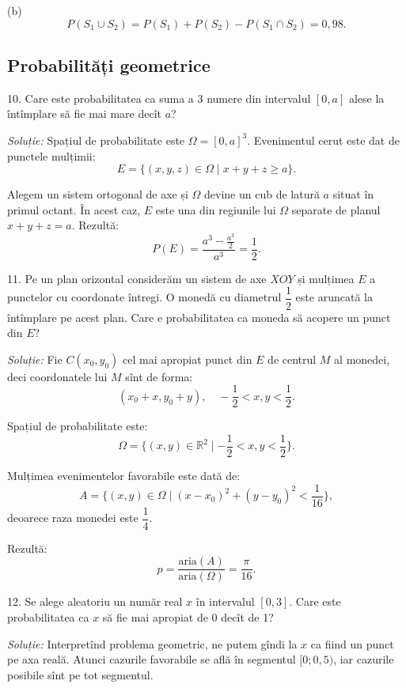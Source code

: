 \documentclass[12pt,a4paper]{article}
\newcommand\RR{\mathbb{R}}
\theoremstyle{dotless}
\theoremstyle{dotlessdr}
\begin{document}
(b) \[
  P(S_1 \cup S_2) = P(S_1) + P(S_2) - P(S_1 \cap S_2) = 0,98.
\]



\subsection*{Probabilități geometrice}

10. Care este probabilitatea ca suma a 3 numere din intervalul $ [0, a] $ alese la
întîmplare să fie mai mare decît $ a $?

\emph{Soluție:} Spațiul de probabilitate este $ \Omega = [0, a]^3 $. Evenimentul
cerut este dat de punctele mulțimii:
\[
  E = \{ (x, y, z) \in \Omega \mid x + y + z \geq a \}.
\]

Alegem un sistem ortogonal de axe și $ \Omega $ devine un cub de latură $ a $
situat în primul octant. În acest caz, $ E $ este una din regiunile lui $ \Omega $
separate de planul $ x + y + z = a $. Rezultă:
\[
  P(E) = \frac{a^3 - \frac{a^3}{2}}{a^3} = \frac{1}{2}.
\]

\vspace{1cm}

11. Pe un plan orizontal considerăm un sistem de axe $ XOY $ și mulțimea $ E $
a punctelor cu coordonate întregi. O monedă cu diametrul $ \dfrac{1}{2} $ este
aruncată la întîmplare pe acest plan. Care e probabilitatea ca moneda să
acopere un punct din $ E $?

\emph{Soluție:} Fie $ C(x_0, y_0) $ cel mai apropiat punct din $ E $ de centrul
$ M $ al monedei, deci coordonatele lui $ M $ sînt de forma:
\[
  (x_0 + x, y_0 + y), \quad -\frac{1}{2} < x,y < \frac{1}{2}.
\]

Spațiul de probabilitate este:
\[
  \Omega = \Big\{(x, y) \in \RR^2 \mid -\frac{1}{2} < x,y < \frac{1}{2} \Big\}.
\]

Mulțimea evenimentelor favorabile este dată de:
\[
  A = \Big\{(x, y) \in \Omega \mid (x - x_0)^2 + (y - y_0)^2 < \frac{1}{16} \Big\},
\]
deoarece raza monedei este $ \dfrac{1}{4} $.

Rezultă:
\[
  p = \frac{\text{aria}(A)}{\text{aria}(\Omega)} = \frac{\pi}{16}.
\]

\vspace{1cm}

12. Se alege aleatoriu un număr real $ x $ în intervalul $ [0, 3] $. Care este
probabilitatea ca $ x $ să fie mai apropiat de 0 decît de 1?

\emph{Soluție:} Interpretînd problema geometric, ne putem gîndi la $ x $ ca fiind
un punct pe axa reală. Atunci cazurile favorabile se află în segmentul $ [0; 0,5) $,
iar cazurile posibile sînt pe tot segmentul.
\end{document}
